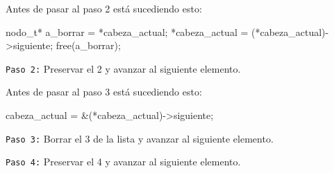 \documentclass[]{scrartcl}
\begin{document}
\begin{center}
  \noindent {}
\end{center}

Antes de pasar al paso 2 está sucediendo esto:
\begin{bashbox}[minted language=C]
    nodo_t* a_borrar = *cabeza_actual;
    *cabeza_actual = (*cabeza_actual)->siguiente;
    free(a_borrar);
\end{bashbox}

\texttt{Paso 2:} Preservar el 2 y avanzar al siguiente elemento. 

\begin{center}
  \noindent {}
\end{center}

Antes de pasar al paso 3 está sucediendo esto:
\begin{bashbox}[minted language=C]
    cabeza_actual = &(*cabeza_actual)->siguiente;
\end{bashbox}

\texttt{Paso 3:} Borrar el 3 de la lista y avanzar al siguiente elemento.

\begin{center}
  \noindent {}
\end{center}
\texttt{Paso 4:} Preservar el 4 y avanzar al siguiente elemento. 

\begin{center}
  \noindent {}
\end{center}
\end{document}
